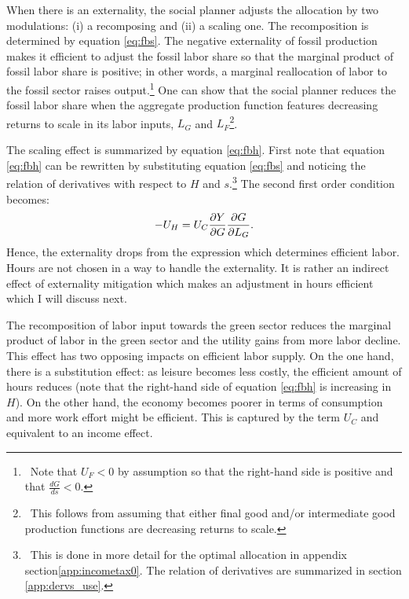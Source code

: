 When there is an externality, the social planner adjusts the allocation by two modulations: (i) a recomposing and (ii) a scaling one. 
The recomposition is determined by equation \ref{eq:fbs}.
The negative externality of fossil production makes it efficient to adjust the fossil labor share so that the marginal product of fossil labor share is positive; in other words, a marginal reallocation of labor to the fossil sector raises output.\footnote{\ Note that $U_F<0$ by assumption so that the right-hand side is positive and that $\frac{dG}{ds}<0$. }
One can show that the social planner reduces the fossil labor share when the aggregate production function features decreasing returns to scale in its labor inputs, $L_G$ and $L_F$\footnote{\ This follows from assuming that either final good and/or intermediate good production functions are decreasing returns to scale.}.
\begin{comment}
The equation 
\begin{align}
\frac{-U_F}{U_C \frac{dY}{dF}}=1+\frac{\frac{dY}{dG}\frac{dG}{ds}}{\frac{dY}{dF}\frac{dF}{ds}}.
\end{align}
The term on the left-hand side is the social cost of the externality: it measures what the representative household is willing to pay for a further reduction in fossil production. 
\end{comment}

The scaling effect is summarized by equation \ref{eq:fbh}.
First note that equation \ref{eq:fbh} can be rewritten by substituting equation \ref{eq:fbs} and noticing the relation of derivatives with respect to $H$ and $s$.\footnote{\ This is done in more detail for the optimal allocation in appendix section\ref{app:incometax0}. The relation of derivatives are summarized in section \ref{app:dervs_use}.}  
The second first order condition becomes:
\begin{align}\label{eq:fbh_simp}
-U_H=U_C\frac{\partial Y}{\partial G}\frac{\partial{G}}{\partial{L_G}}.
\end{align}
Hence, the externality drops from the expression which determines efficient labor. Hours are not chosen in a way to handle the externality. It is rather an indirect effect of externality mitigation which makes an adjustment in hours efficient which I will discuss next.

The recomposition of labor input towards the  green sector reduces the marginal product of labor in the green sector and the utility gains from more labor decline.  This effect has two opposing impacts on efficient labor supply. On the one hand, there is a substitution effect: as leisure becomes less costly, the efficient amount of hours reduces (note that the right-hand side of equation \ref{eq:fbh} is increasing in $H$). On the other hand, the economy becomes poorer in terms of consumption and more work effort might be efficient. This is captured by the term $U_C$ and equivalent to an income effect. 

